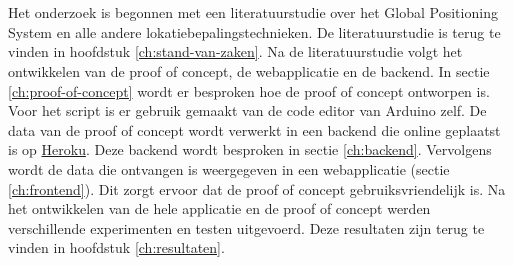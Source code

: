 
\chapter{}
\label{ch:methodologie}

Het onderzoek is begonnen met een literatuurstudie over het Global Positioning System en alle andere lokatiebepalingstechnieken. De literatuurstudie is terug te vinden in hoofdstuk \ref{ch:stand-van-zaken}.
\newline
\newline
Na de literatuurstudie volgt het ontwikkelen van de proof of concept, de webapplicatie en de backend. In sectie \ref{ch:proof-of-concept} wordt er besproken hoe de proof of concept ontworpen is. Voor het script is er gebruik gemaakt van de code editor van Arduino zelf. 
\newline
\newline
De data van de proof of concept wordt verwerkt in een backend die online geplaatst is op \href{www.heroku.com}{Heroku}. Deze backend wordt besproken in sectie \ref{ch:backend}.
\newline
\newline
Vervolgens wordt de data die ontvangen is weergegeven in een webapplicatie (sectie \ref{ch:frontend}). Dit zorgt ervoor dat de proof of concept gebruiksvriendelijk is. 
\newline
\newline
Na het ontwikkelen van de hele applicatie en de proof of concept werden verschillende experimenten en testen uitgevoerd. Deze resultaten zijn terug te vinden in hoofdstuk \ref{ch:resultaten}.
